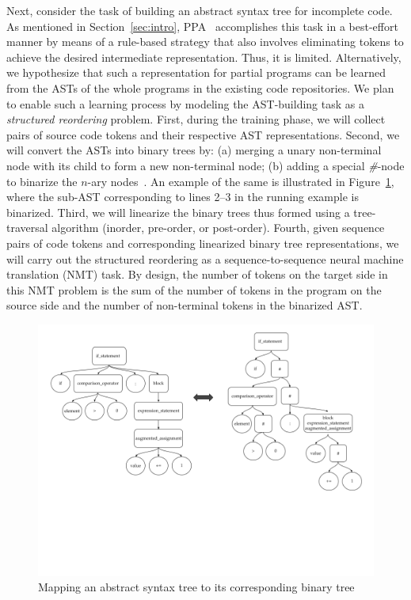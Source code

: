 Next, consider the task of building an abstract syntax tree for incomplete code. As mentioned in Section~\ref{sec:intro}, PPA~\cite{ppa08} accomplishes this task in a best-effort manner by means of a rule-based strategy that also involves eliminating tokens to achieve the desired intermediate representation. Thus, it is limited. Alternatively, we hypothesize that such a representation for partial programs can be learned from the ASTs of the whole programs in the existing code repositories. We plan to enable such a learning process by modeling the AST-building task as a {\em structured reordering} problem. First, during the training phase, we will collect pairs of source code tokens and their respective AST representations. Second, we will convert the ASTs into binary trees by: (a) merging a unary non-terminal node with its child to form a new non-terminal node; (b) adding a special {\em \#}-node to binarize the $n$-ary nodes~\cite{https://doi.org/10.48550/arxiv.2206.11719}. An example of the same is illustrated in Figure~\ref{fig:ast-bt-mapping}, where the sub-AST corresponding to lines 2--3 in the running example is binarized. Third, we will linearize the binary trees thus formed using a tree-traversal algorithm (inorder, pre-order, or post-order). Fourth, given sequence pairs of code tokens and corresponding linearized binary tree representations, we will carry out the structured reordering as a sequence-to-sequence neural machine translation (NMT) task. By design, the number of tokens on the target side in this NMT problem is the sum of the number of tokens in the program on the source side and the number of non-terminal tokens in the binarized AST.

\begin{figure}[h]
    \centering
    \includegraphics[width=\textwidth]{figures/ast-bt.png}
    \vspace{-130pt}
    \caption{Mapping an abstract syntax tree to its corresponding binary tree}
    \label{fig:ast-bt-mapping}
\end{figure}

